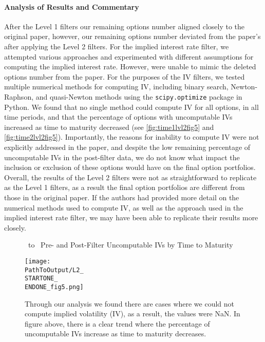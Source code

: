 \paragraph{Analysis of Results and Commentary}
After the Level 1 filters our remaining options number aligned closely to the original paper, however, our remaining options number deviated from the paper's after applying the Level 2 filters. For the implied interest rate filter, we attempted various approaches and experimented with different assumptions for computing the implied interest rate. However, were unable to mimic the deleted options number from the paper. For the purposes of the IV filters, we tested multiple numerical methods for computing IV, including binary search, Newton-Raphson, and quasi-Newton methods using the \texttt{scipy.optimize} package in Python. We found that no single method could compute IV for all options, in all time periods, and that the percentage of options with uncomputable IVs increased as time to maturity decreased (see \autoref{fig:time1lvl2fig5} and \autoref{fig:time2lvl2fig5}). Importantly, the reasons for inability to compute IV were not explicitly addressed in the paper, and despite the low remaining percentage of uncomputable IVs in the post-filter data, we do not know what impact the inclusion or exclusion of these options would have on the final option portfolios. Overall, the results of the Level 2 filters were not as straightforward to replicate as the Level 1 filters, as a result the final option portfolios are different from those in the original paper. If the authors had provided more detail on the numerical methods used to compute IV, as well as the approach used in the implied interest rate filter, we may have been able to replicate their results more closely.

\vspace{20pt}
\begin{figure}[H] %
  \centering
  \caption{\STARTONE\ to \ENDONE\ Pre- and Post-Filter Uncomputable IVs by Time to Maturity}
  \texttt{[image: \\PathToOutput/L2\_\\STARTONE\_\\ENDONE\_fig5.png]}
  \caption*{Through our analysis we found there are cases where we could not compute implied volatility (IV), as a result, the values were NaN. In figure above, there is a clear trend where the percentage of uncomputable IVs increase as time to maturity decreases.}
  \label{fig:time1lvl2fig5}
\end{figure}


